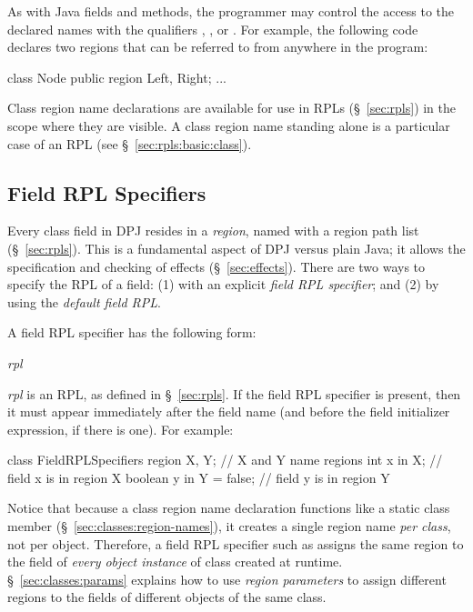 As with Java fields and methods, the programmer may control the access
to the declared names with the qualifiers , ,
or .  For example, the following code declares two
regions that can be referred to from anywhere in the program:

\begin{dpjlisting}
class Node {
  public region Left, Right;
  ...
}
\end{dpjlisting}

Class region name declarations are available for use in RPLs
(\S~\ref{sec:rpls}) in the scope where they are visible.  A class
region name standing alone is a particular case of an RPL (see
\S~\ref{sec:rpls:basic:class}).

\subsection{Field RPL Specifiers%
\label{sec:classes:field-region-spec}}

Every class field in DPJ resides in a \emph{region}, named with a
region path list (\S~\ref{sec:rpls}).  This is a fundamental aspect of
DPJ versus plain Java; it allows the specification and checking of
effects (\S~\ref{sec:effects}). There are two ways to specify the RPL
of a field: (1) with an explicit \emph{field RPL specifier}; and (2)
by using the \emph{default field RPL}.

 A field RPL specifier has the
following form:
%
\begin{description}
\item {} \emph{rpl}
\end{description}
%
\emph{rpl} is an RPL, as defined in \S~\ref{sec:rpls}.  If the field
RPL specifier is present, then it must appear immediately after the
field name (and before the field initializer expression, if there is
one).  For example:
%
\begin{dpjlisting}
class FieldRPLSpecifiers {
  region X, Y;             // X and Y name regions
  int x in X;              // field x is in region X
  boolean y in Y = false;  // field y is in region Y
}
\end{dpjlisting}
%
Notice that because a class region name declaration functions like a
static class member (\S~\ref{sec:classes:region-names}), it creates a
single region name \emph{per class}, not per object.  Therefore, a
field RPL specifier such as  assigns the same
region  to the field of \emph{every object
  instance} of class  created at runtime.
\S~\ref{sec:classes:params} explains how to use \emph{region
  parameters} to assign different regions to the fields of different
objects of the same class.


